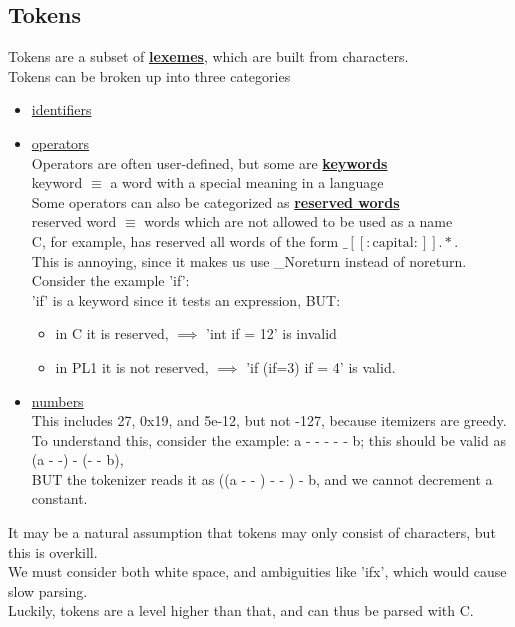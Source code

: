 \documentclass[../../lecture_notes.tex]{subfiles}
\begin{document}
\subsection*{Tokens}
Tokens are a subset of \textbf{\underline{lexemes}}, which are built from characters.\\
Tokens can be broken up into three categories \begin{itemize}[itemsep=0mm]
	\item \underline{identifiers} 
	\item \underline{operators} \\
		Operators are often user-defined, but some are \textbf{\underline{keywords}}\\
		\indent keyword $\equiv$ a word with a special meaning in a language\\
		Some operators can also be categorized as \textbf{\underline{reserved words}}\\
		\indent reserved word $\equiv$ words which are not allowed to be used as a name\\
		C, for example, has reserved all words of the form $\_[[:\mbox{capital}:]].*$.\\
		This is annoying, since it makes us use \_Noreturn instead of noreturn.\\
		Consider the example 'if':\\
			'if' is a keyword since it tests an expression, BUT: \begin{itemize}[itemsep=0mm]
			\item in C it is reserved, $\implies$ 'int if = 12' is invalid\\
			\item in PL1 it is not reserved, $\implies$ 'if (if=3) if = 4' is valid.
			\end{itemize}
	\item \underline{numbers} \\
		This includes 27, 0x19, and 5e-12, but not -127, because itemizers are greedy.\\
		To understand this, consider the example: a - - - - - b; this should be valid as (a - -) - (- - b), 
		\\ BUT the tokenizer reads it as ((a - - ) - - ) - b, and we cannot decrement a constant.
\end{itemize}
It may be a natural assumption that tokens may only consist of characters, but this is overkill.\\
We must consider both white space, and ambiguities like 'ifx', which would cause slow parsing.\\
Luckily, tokens are a level higher than that, and can thus be parsed with C.
\end{document}
